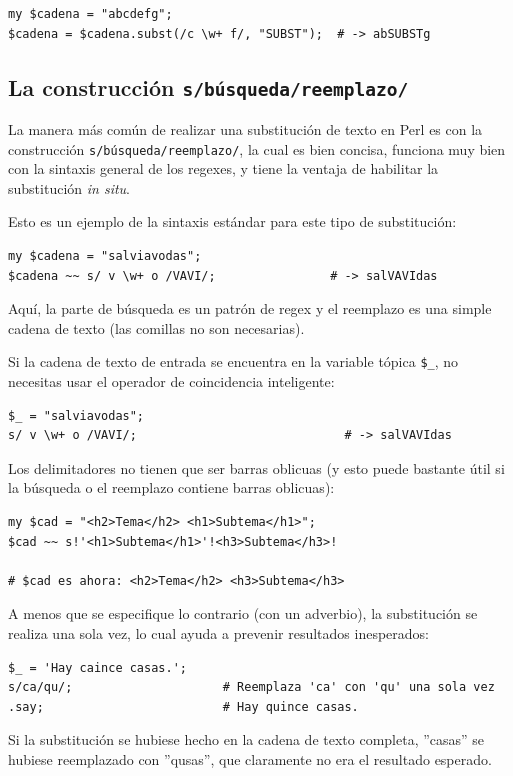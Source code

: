 \begin{verbatim}
my $cadena = "abcdefg";
$cadena = $cadena.subst(/c \w+ f/, "SUBST");  # -> abSUBSTg
\end{verbatim}

\subsection{La construcción {\tt s/búsqueda/reemplazo/}}

La manera más común de realizar una substitución de texto en Perl
es con la construcción \verb|s/búsqueda/reemplazo/|, la cual es
bien concisa, funciona muy bien con la sintaxis general de los regexes,
y tiene la ventaja de habilitar la substitución \emph{in situ}.

Esto es un ejemplo de la sintaxis estándar para este tipo de
substitución:

\begin{verbatim}
my $cadena = "salviavodas";
$cadena ~~ s/ v \w+ o /VAVI/;                # -> salVAVIdas
\end{verbatim}

Aquí, la parte de búsqueda es un patrón de regex y el reemplazo
es una simple cadena de texto (las comillas no son necesarias).

Si la cadena de texto de entrada se encuentra en la variable tópica
\verb|$_|, no necesitas usar el operador de coincidencia inteligente:

\begin{verbatim}
$_ = "salviavodas";
s/ v \w+ o /VAVI/;                             # -> salVAVIdas
\end{verbatim}
%

Los delimitadores no tienen que ser barras oblicuas (y esto puede 
bastante útil si la búsqueda o el reemplazo contiene barras oblicuas):

\begin{verbatim}
my $cad = "<h2>Tema</h2> <h1>Subtema</h1>";
$cad ~~ s!'<h1>Subtema</h1>'!<h3>Subtema</h3>! 

# $cad es ahora: <h2>Tema</h2> <h3>Subtema</h3>
\end{verbatim}
%


A menos que se especifique lo contrario (con un adverbio), la
substitución se realiza una sola vez, lo cual ayuda a prevenir
resultados inesperados:

\begin{verbatim}
$_ = 'Hay caince casas.';
s/ca/qu/;                     # Reemplaza 'ca' con 'qu' una sola vez
.say;                         # Hay quince casas.
\end{verbatim}
%
Si la substitución se hubiese hecho en la cadena de texto completa,
''casas'' se hubiese reemplazado con ''qusas'', que claramente
no era el resultado esperado.

